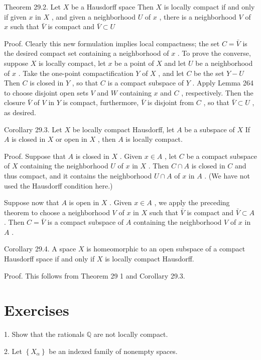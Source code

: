 \documentclass[10pt]{article}
\begin{document}
Theorem 29.2. Let \(X\) be a Hausdorff space Then \(X\) is locally compact if and only if given \(x\) in \(X\) , and given a neighborhood \(U\) of \(x\) , there is a neighborhood \(V\) of \(x\) such that \(\bar{V}\) is compact and \(\bar{V} \subset  U\)

Proof. Clearly this new formulation implies local compactness; the set \(C = \bar{V}\) is the desired compact set containing a neighborhood of \(x\) . To prove the converse, suppose \(X\) is locally compact, let \(x\) be a point of \(X\) and let \(U\) be a neighborhood of \(x\) . Take the one-point compactification \(Y\) of \(X\) , and let \(C\) be the set \(Y - U\) Then \(C\) is closed in \(Y\) , so that \(C\) is a compact subspace of \(Y\) . Apply Lemma 264 to choose disjoint open sets \(V\) and \(W\) containing \(x\) and \(C\) , respectively. Then the closure \(\bar{V}\) of \(V\) in \(Y\) is compact, furthermore, \(\bar{V}\) is disjoint from \(C\) , so that \(\bar{V} \subset  U\) , as desired.

Corollary 29.3. Let \(X\) be locally compact Hausdorff, let \(A\) be a subspace of \(X\) If \(A\) is closed in \(X\) or open in \(X\) , then \(A\) is locally compact.

Proof. Suppose that \(A\) is closed in \(X\) . Given \(x \in  A\) , let \(C\) be a compact subspace of \(X\) containing the neighborhood \(U\) of \(x\) in \(X\) . Then \(C \cap  A\) is closed in \(C\) and thus compact, and it contains the neighborhood \(U \cap  A\) of \(x\) in \(A\) . (We have not used the Hausdorff condition here.)

Suppose now that \(A\) is open in \(X\) . Given \(x \in  A\) , we apply the preceding theorem to choose a neighborhood \(V\) of \(x\) in \(X\) such that \(\bar{V}\) is compact and \(\bar{V} \subset  A\) . Then \(C = \bar{V}\) is a compact subspace of \(A\) containing the neighborhood \(V\) of \(x\) in \(A\) .

Corollary 29.4. A space \(X\) is homeomorphic to an open subspace of a compact Hausdorff space if and only if \(X\) is locally compact Hausdorff.

Proof. This follows from Theorem 29 1 and Corollary 29.3.

\section*{Exercises}

1. Show that the rationals \(\mathbb{Q}\) are not locally compact.

2. Let \(\left\{  {X}_{\alpha }\right\}\) be an indexed family of nonempty spaces.
\end{document}
